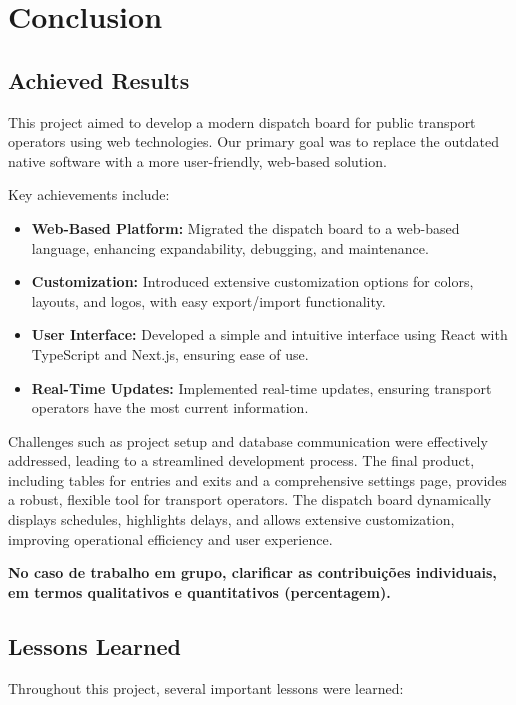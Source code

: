 \documentclass[10pt]{article}
\begin{document}
        \section{Conclusion}


        \subsection{Achieved Results}
        This project aimed to develop a modern dispatch board for public transport operators using web technologies. Our primary goal was to replace the outdated native software with a more user-friendly, web-based solution. 

        Key achievements include:

        \begin{itemize}
            \item \textbf{Web-Based Platform:} Migrated the dispatch board to a web-based language, enhancing expandability, debugging, and maintenance.
            \item \textbf{Customization:} Introduced extensive customization options for colors, layouts, and logos, with easy export/import functionality.
            \item \textbf{User Interface:} Developed a simple and intuitive interface using React with TypeScript and Next.js, ensuring ease of use.
            \item \textbf{Real-Time Updates:} Implemented real-time updates, ensuring transport operators have the most current information.
        \end{itemize}

        Challenges such as project setup and database communication were effectively addressed, leading to a streamlined development process. The final product, including tables for entries and exits and a comprehensive settings page, provides a robust, flexible tool for transport operators. The dispatch board dynamically displays schedules, highlights delays, and allows extensive customization, improving operational efficiency and user experience.


        \textbf{No caso de trabalho em grupo, clarificar as contribuições individuais, em termos qualitativos e quantitativos (percentagem).}
         \subsection{Lessons Learned}

         Throughout this project, several important lessons were learned:
         
\end{document}
